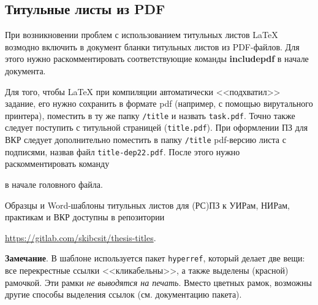 \subsection{Титульные листы из PDF}

При возникновении проблем с использованием титульных листов \LaTeX{} возмодно
включить в документ бланки титульных листов из PDF-файлов. Для этого нужно
раскомментировать соответствующие команды \textbf{includepdf} в начале
документа.

Для того, чтобы \LaTeX{} при компиляции автоматически <<подхватил>> задание, его
нужно сохранить в формате pdf (например, с помощью вирутального принтера),
поместить в ту же папку \texttt{/title} и назвать \texttt{task.pdf}. Точно также
следует поступить с титульной страницей (\texttt{title.pdf}). При оформлении ПЗ
для ВКР следует дополнительно поместить в папку \texttt{/title} pdf-версию листа
с подписями, назвав файл \texttt{title-dep22.pdf}. После этого нужно
раскомментировать команду
\begin{center}
  \verb||
\end{center}
в начале головного файла.

Образцы и Word-шаблоны титульных листов для (РС)ПЗ к УИРам, НИРам, практикам и
ВКР доступны в репозитории
\begin{center}
  \url{https://gitlab.com/skibcsit/thesis-titles}.
\end{center}  

\textbf{Замечание}. В шаблоне используется пакет \texttt{hyperref}, который
делает две вещи: все перекрестные ссылки <<кликабельны>>, а также выделены
(красной) рамочкой. Эти рамки \textit{не выводятся на печать}. Вместо цветных
рамок, возможны другие способы выделения ссылок (см. документацию пакета).

